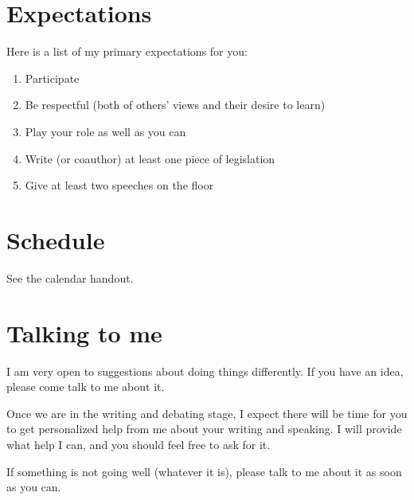 \documentclass[,article,oneside,notitlepage]{memoir}
\begin{document}
\section{Expectations}

Here is a list of my primary expectations for you:

\begin{enumerate}
\def\labelenumi{\arabic{enumi}.}
\itemsep1pt\parskip0pt
\item
  Participate
\item
  Be respectful (both of others' views and their desire to learn)
\item
  Play your role as well as you can
\item
  Write (or coauthor) at least one piece of legislation
\item
  Give at least two speeches on the floor
\end{enumerate}

\section{Schedule}

See the calendar handout.

\section{Talking to me}

I am very open to suggestions about doing things differently. If you
have an idea, please come talk to me about it.

Once we are in the writing and debating stage, I expect there will be
time for you to get personalized help from me about your writing and
speaking. I will provide what help I can, and you should feel free to
ask for it.

If something is not going well (whatever it is), please talk to me about
it as soon as you can.
\end{document}
